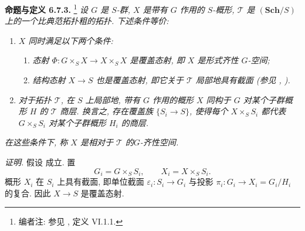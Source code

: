 \medskip
\noindent{}\textbf{命题与定义 6.7.3.}
\footnote{编者注: 参见 , 定义 VI.1.1.}
\textit{设 \(G\) 是 \(S\)-群, \(X\) 是带有 \(G\) 作用的 \(S\)-概形,
\(\mathcal T\) 是 \((\mathbf{Sch}/S)\) 上的一个比典范拓扑粗的拓扑.
下述条件等价:}
\begin{enumerate}
  \item[(i)] \textit{\(X\) 同时满足以下两个条件:}
    \begin{enumerate}
      \item[(1)] \textit{态射
        \(\Phi:G\times_SX\to X\times_SX\) 是覆盖态射,
        即 \(X\) 是形式齐性 \(G\)-空间;}
      \item[(2)] \textit{结构态射
        \(X\to S\) 也是覆盖态射, 即它关于 \(\mathcal T\) 局部地具有截面
        (参见 ,
        ).}
    \end{enumerate}

  \item[(ii)] \textit{对于拓扑 \(\mathcal T\),
    在 \(S\) 上局部地, 带有 \(G\) 作用的概形 \(X\)
    同构于 \(G\) 对某个子群概形 \(H\) 的 \(\mathcal T\) 商层.
    换言之, 存在覆盖族 \(\{S_i\to S\}\),
    使得每个 \(X\times_SS_i\) 都代表 \(G\times_SS_i\) 对某个子群概形 \(H_i\)
    的商层.}
\end{enumerate}
\textit{在这些条件下, 称 \(X\) 是相对于 \(\mathcal T\) 的\emph{\(G\)-齐性空间}.}

\smallskip
\noindent\textit{证明.}
假设  成立. 置
\[
  G_i=G\times_SS_i,\qquad X_i=X\times_SS_i.
\]
概形 \(X_i\) 在 \(S_i\) 上具有截面,
即单位截面 \(\varepsilon_i:S_i\to G_i\)
与投影 \(\pi_i:G_i\to X_i=G_i/H_i\) 的复合.
因此 \(X\to S\) 是覆盖态射.

